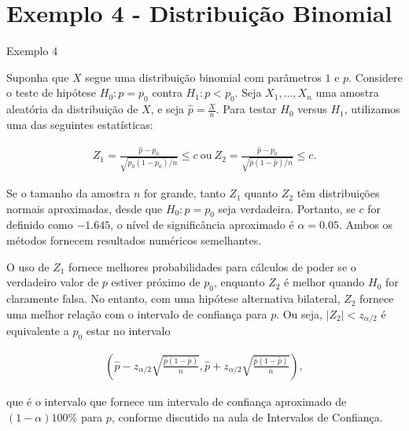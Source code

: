 \documentclass[12pt]{beamer}
\begin{document}
\section{Exemplo 4 - Distribuição Binomial}
\begin{frame}{Exemplo 4}
\begin{block}{}
\justifying
Suponha que $X$ segue uma distribuição binomial com parâmetros $1$ e $p$. Considere o teste de hipótese $H_0 : p = p_0$ contra $H_1 : p < p_0$. Seja $X_1, \ldots, X_n$ uma amostra aleatória da distribuição de $X$, e seja $\hat{p} = \frac{X}{n}$. Para testar $H_0$ versus $H_1$, utilizamos uma das seguintes estatísticas:

\begin{align*}
Z_1 = \frac{\hat{p} - p_0}{\sqrt{p_0(1 - p_0)/n}} \leq c~\text{ou}~Z_2 = \frac{\hat{p}-p_0}{\sqrt{\hat{p}(1 - \hat{p})/n}} \leq c.
\end{align*}

Se o tamanho da amostra $n$ for grande, tanto $Z_1$ quanto $Z_2$ têm distribuições normais aproximadas, desde que $H_0 : p = p_0$ seja verdadeira. Portanto, se $c$ for definido como $-1.645$, o nível de significância aproximado é $\alpha = 0.05$. Ambos os métodos fornecem resultados numéricos semelhantes.
\end{block}
\end{frame}


\begin{frame}{}
\begin{block}{}
\justifying
O uso de $Z_1$ fornece melhores probabilidades para cálculos de poder se o verdadeiro valor de $p$ estiver próximo de $p_0$, enquanto $Z_2$ é melhor quando $H_0$ for claramente falsa. No entanto, com uma hipótese alternativa bilateral, $Z_2$ fornece uma melhor relação com o intervalo de confiança para $p$. Ou seja, $|Z_2| < z_{\alpha/2}$ é equivalente a $p_0$ estar no intervalo

\begin{align*}
\left(\hat{p} - z_{\alpha/2}\sqrt{\frac{\hat{p}(1 - \hat{p})}{n}}, \hat{p} + z_{\alpha/2}\sqrt{\frac{\hat{p}(1 - \hat{p})}{n}}\right),
\end{align*}

que é o intervalo que fornece um intervalo de confiança aproximado de $(1 - \alpha)100\%$ para $p$, conforme discutido na aula de Intervalos de Confiança.
\end{block}
\end{frame}
\end{document}
